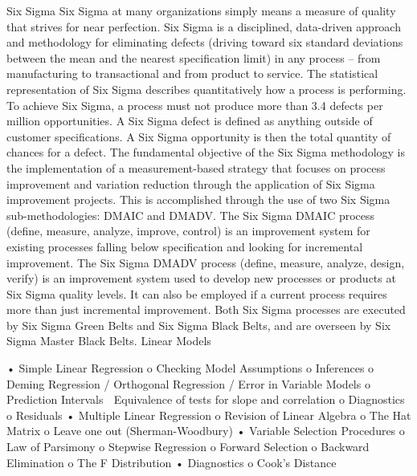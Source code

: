 Six Sigma 
Six Sigma at many organizations simply means a measure of quality that strives for near perfection. Six Sigma is a disciplined,  data-driven approach and methodology for eliminating defects (driving 
toward six standard deviations between the mean and the nearest specification limit) in any process – from manufacturing to transactional and from product to service. The statistical representation of Six Sigma describes quantitatively how a process is performing. To achieve Six Sigma, a process must not produce more than 3.4 defects per million opportunities. A Six Sigma defect is defined as anything outside of customer specifications. A Six Sigma opportunity is then the total quantity of chances for a defect. The fundamental objective of the Six Sigma methodology is the implementation of a measurement-based strategy that focuses on process improvement and variation reduction through the application of Six Sigma improvement projects. 
This is accomplished through the use of two Six Sigma sub-methodologies: DMAIC and DMADV.  The Six Sigma DMAIC process (define, measure, analyze, improve, control) is an improvement system for existing processes falling below specification and looking for incremental improvement. 
The Six Sigma DMADV process (define, measure, analyze, design, verify) is an improvement system used to develop new processes or products at Six Sigma quality levels. It can also be employed if a current process requires more than just incremental improvement.
Both Six Sigma processes are executed by Six Sigma Green Belts and Six Sigma Black Belts, and are overseen by Six Sigma Master Black Belts.
Linear Models

•	Simple Linear Regression 
o	Checking Model Assumptions
o	Inferences
o	Deming Regression / Orthogonal Regression / Error in Variable Models
o	Prediction Intervals
	Equivalence of tests for slope and correlation 
o	Diagnostics
o	Residuals
•	Multiple Linear Regression
o	Revision of Linear Algebra
o	The Hat Matrix
o	Leave one out (Sherman-Woodbury)
•	Variable Selection Procedures
o	Law of Parsimony
o	Stepwise Regression
o	Forward Selection
o	Backward Elimination
o	The F Distribution
•	Diagnostics
o	Cook’s Distance

